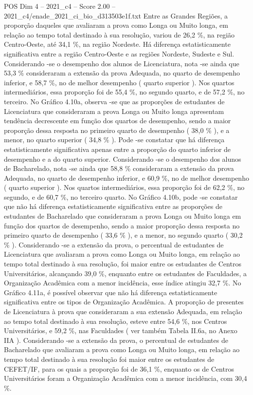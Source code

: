\begin{textsample}{POS Dim 4 – 2021\_c4 – Score 2.00 – 2021\_c4/enade\_2021\_ci\_bio\_d313503e1f.txt}
Entre as Grandes Regiões, a proporção daqueles que avaliaram a prova como Longa ou Muito longa, em relação ao tempo total destinado à sua resolução, variou de 26,2 \%, na região Centro-Oeste, até 34,1 \%, na região Nordeste.
Há diferença estatisticamente significativa entre a região Centro-Oeste e as regiões Nordeste, Sudeste e Sul.
Considerando -se o desempenho dos alunos de Licenciatura, nota -se ainda que 53,3 \% consideraram a extensão da prova Adequada, no quarto de desempenho inferior, e 58,7 \%, no de melhor desempenho ( quarto superior ).
Nos quartos intermediários, essa proporção foi de 55,4 \%, no segundo quarto, e de 57,2 \%, no terceiro.
No Gráfico 4.10a, observa -se que as proporções de estudantes de Licenciatura que consideraram a prova Longa ou Muito longa apresentam tendência decrescente em função dos quartos de desempenho, sendo a maior proporção dessa resposta no primeiro quarto de desempenho ( 38,0 \% ), e a menor, no quarto superior ( 34,8 \% ).
Pode -se constatar que há diferença estatisticamente significativa apenas entre a proporção do quarto inferior de desempenho e a do quarto superior.
Considerando -se o desempenho dos alunos de Bacharelado, nota -se ainda que 58,8 \% consideraram a extensão da prova Adequada, no quarto de desempenho inferior, e 60,9 \%, no de melhor desempenho ( quarto superior ).
Nos quartos intermediários, essa proporção foi de 62,2 \%, no segundo, e de 60,7 \%, no terceiro quarto.
No Gráfico 4.10b, pode -se constatar que não há diferença estatisticamente significativa entre as proporções de estudantes de Bacharelado que consideraram a prova Longa ou Muito longa em função dos quartos de desempenho, sendo a maior proporção dessa resposta no primeiro quarto de desempenho ( 33,6 \% ), e a menor, no segundo quarto ( 30,2 \% ).
Considerando -se a extensão da prova, o percentual de estudantes de Licenciatura que avaliaram a prova como Longa ou Muito longa, em relação ao tempo total destinado à sua resolução, foi maior entre os estudantes de Centros Universitários, alcançando 39,0 \%, enquanto entre os estudantes de Faculdades, a Organização Acadêmica com a menor incidência, esse índice atingiu 32,7 \%.
No Gráfico 4.11a, é possível observar que não há diferença estatisticamente significativa entre os tipos de Organização Acadêmica.
A proporção de presentes de Licenciatura à prova que consideraram a sua extensão Adequada, em relação ao tempo total destinado à sua resolução, esteve entre 54,6 \%, nos Centros Universitários, e 59,2 \%, nas Faculdades ( ver também Tabela II.6a, no Anexo IIA ).
Considerando -se a extensão da prova, o percentual de estudantes de Bacharelado que avaliaram a prova como Longa ou Muito longa, em relação ao tempo total destinado à sua resolução foi maior entre os estudantes de CEFET/IF, para os quais a proporção foi de 36,1 \%, enquanto os de Centros Universitários foram a Organização Acadêmica com a menor incidência, com 30,4 \%.

\end{textsample}
